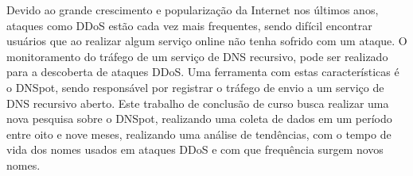 
\bacharelado {}
\data {\today}



\ttorientador{$ $}
\ttexaminadorum{$ $}
\ttexaminadordois{$ $}

\newpage
\pagestyle{empty}

\maketitle



Devido ao grande crescimento e popularização da Internet nos últimos anos, ataques como DDoS estão cada vez mais frequentes, sendo difícil encontrar usuários que ao realizar algum serviço online não tenha sofrido com um ataque. O monitoramento do tráfego de um serviço de DNS recursivo, pode ser realizado para a descoberta de ataques DDoS. Uma ferramenta com estas características é o DNSpot, sendo responsável por registrar o tráfego de envio a um serviço de DNS recursivo aberto. Este trabalho de conclusão de curso busca realizar uma nova pesquisa sobre o DNSpot, realizando uma coleta de dados em um período entre oito e nove meses, realizando uma análise de tendências, com o tempo de vida dos nomes usados em ataques DDoS e com que frequência surgem novos nomes.

